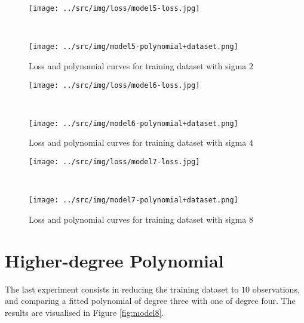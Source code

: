 \documentclass[a4paper,12pt]{article} %
\begin{document}
	\begin{figure}[H]
		\begin{minipage}[c]{.49\textwidth}
			\centering
			\texttt{[image: ../src/img/loss/model5-loss.jpg]}
		\end{minipage}
		~
		\begin{minipage}[c]{.49\textwidth}
			\centering
			\texttt{[image: ../src/img/model5-polynomial+dataset.png]}
		\end{minipage}
		\caption{Loss and polynomial curves for training dataset with sigma $2$}
	\end{figure}
	
	\begin{figure}[H]
		\begin{minipage}[c]{.49\textwidth}
			\centering
			\texttt{[image: ../src/img/loss/model6-loss.jpg]}
		\end{minipage}
		~
		\begin{minipage}[c]{.49\textwidth}
			\centering
			\texttt{[image: ../src/img/model6-polynomial+dataset.png]}
		\end{minipage}
	\caption{Loss and polynomial curves for training dataset with sigma $4$}
	\end{figure}
	
	\begin{figure}[H]
		\begin{minipage}[c]{.49\textwidth}
			\centering
			\texttt{[image: ../src/img/loss/model7-loss.jpg]}
		\end{minipage}
		~
		\begin{minipage}[c]{.49\textwidth}
			\centering
			\texttt{[image: ../src/img/model7-polynomial+dataset.png]}
		\end{minipage}
	\caption{Loss and polynomial curves for training dataset with sigma $8$}
	\end{figure}
	
	
	\section{Higher-degree Polynomial}
	The last experiment consists in reducing the training dataset to $10$ 
	observations, and comparing a fitted polynomial of degree three with 
	one of degree four.
	The results are visualised in Figure \ref*{fig:model8}.
	
\end{document}
